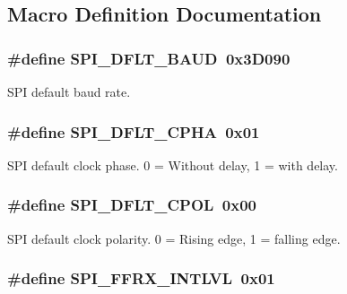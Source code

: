 \subsection{Macro Definition Documentation}
\hypertarget{a00051_a02b50bd3a63177b3074b0aa1ed813e38}{
\subsubsection[{S\-P\-I\-\_\-\-D\-F\-L\-T\-\_\-\-B\-A\-U\-D}]{\setlength{\rightskip}{0pt plus 5cm}\#define S\-P\-I\-\_\-\-D\-F\-L\-T\-\_\-\-B\-A\-U\-D~0x3\-D090}}\label{a00051_a02b50bd3a63177b3074b0aa1ed813e38}
S\-P\-I default baud rate. \hypertarget{a00051_a8ef22e1c92c431c764876c93a6e53f40}{
\subsubsection[{S\-P\-I\-\_\-\-D\-F\-L\-T\-\_\-\-C\-P\-H\-A}]{\setlength{\rightskip}{0pt plus 5cm}\#define S\-P\-I\-\_\-\-D\-F\-L\-T\-\_\-\-C\-P\-H\-A~0x01}}\label{a00051_a8ef22e1c92c431c764876c93a6e53f40}
S\-P\-I default clock phase. 0 = Without delay, 1 = with delay. \hypertarget{a00051_a203ac5cf3a2f7ee6932c53909a2b41e8}{
\subsubsection[{S\-P\-I\-\_\-\-D\-F\-L\-T\-\_\-\-C\-P\-O\-L}]{\setlength{\rightskip}{0pt plus 5cm}\#define S\-P\-I\-\_\-\-D\-F\-L\-T\-\_\-\-C\-P\-O\-L~0x00}}\label{a00051_a203ac5cf3a2f7ee6932c53909a2b41e8}
S\-P\-I default clock polarity. 0 = Rising edge, 1 = falling edge. \hypertarget{a00051_aaf3e602cf02d489821651ca9ee6774ea}{
\subsubsection[{S\-P\-I\-\_\-\-F\-F\-R\-X\-\_\-\-I\-N\-T\-L\-V\-L}]{\setlength{\rightskip}{0pt plus 5cm}\#define S\-P\-I\-\_\-\-F\-F\-R\-X\-\_\-\-I\-N\-T\-L\-V\-L~0x01}}\label{a00051_aaf3e602cf02d489821651ca9ee6774ea}
